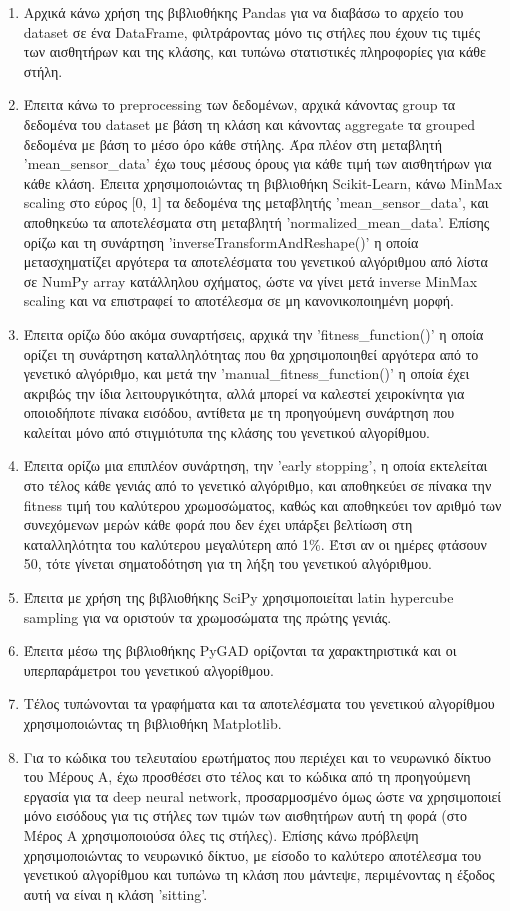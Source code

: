 \documentclass[12pt,a4paper]{article}
\begin{document}
\begin{enumerate}
    \item Αρχικά κάνω χρήση της βιβλιοθήκης Pandas για να διαβάσω το αρχείο του dataset σε ένα DataFrame, φιλτράροντας μόνο τις στήλες που έχουν τις τιμές των αισθητήρων και της κλάσης, και τυπώνω στατιστικές πληροφορίες για κάθε στήλη.
    \item Έπειτα κάνω το preprocessing των δεδομένων, αρχικά κάνοντας group τα δεδομένα του dataset με βάση τη κλάση και κάνοντας aggregate τα grouped δεδομένα με βάση το μέσο όρο κάθε στήλης. Άρα πλέον στη μεταβλητή 'mean\_sensor\_data' έχω τους μέσους όρους για κάθε τιμή των αισθητήρων για κάθε κλάση. Έπειτα χρησιμοποιώντας τη βιβλιοθήκη Scikit-Learn, κάνω MinMax scaling στο εύρος [0, 1] τα δεδομένα της μεταβλητής 'mean\_sensor\_data', και αποθηκεύω τα αποτελέσματα στη μεταβλητή 'normalized\_mean\_data'. Επίσης ορίζω και τη συνάρτηση 'inverseTransformAndReshape()' η οποία μετασχηματίζει αργότερα τα αποτελέσματα του γενετικού αλγόριθμου από λίστα σε ΝumPy array κατάλληλου σχήματος, ώστε να γίνει μετά inverse MinMax scaling και να επιστραφεί το αποτέλεσμα σε μη κανονικοποιημένη μορφή.
    \item Έπειτα ορίζω δύο ακόμα συναρτήσεις, αρχικά την 'fitness\_function()' η οποία ορίζει τη συνάρτηση καταλληλότητας που θα χρησιμοποιηθεί αργότερα από το γενετικό αλγόριθμο, και μετά την 'manual\_fitness\_function()' η οποία έχει ακριβώς την ίδια λειτουργικότητα, αλλά μπορεί να καλεστεί χειροκίνητα για οποιοδήποτε πίνακα εισόδου, αντίθετα με τη προηγούμενη συνάρτηση που καλείται μόνο από στιγμιότυπα της κλάσης του γενετικού αλγορίθμου.
    \item Έπειτα ορίζω μια επιπλέον συνάρτηση, την 'early stopping', η οποία εκτελείται στο τέλος κάθε γενιάς από το γενετικό αλγόριθμο, και αποθηκεύει σε πίνακα την fitness τιμή του καλύτερου χρωμοσώματος, καθώς και αποθηκεύει τον αριθμό των συνεχόμενων μερών κάθε φορά που δεν έχει υπάρξει βελτίωση στη καταλληλότητα του καλύτερου μεγαλύτερη από 1\%. Έτσι αν οι ημέρες φτάσουν 50, τότε γίνεται σηματοδότηση για τη λήξη του γενετικού αλγόριθμου.
    \item Έπειτα με χρήση της βιβλιοθήκης SciPy χρησιμοποιείται latin hypercube sampling για να οριστούν τα χρωμοσώματα της πρώτης γενιάς.
    \item Έπειτα μέσω της βιβλιοθήκης PyGAD ορίζονται τα χαρακτηριστικά και οι υπερπαράμετροι του γενετικού αλγορίθμου.
    \item Τέλος τυπώνονται τα γραφήματα και τα αποτελέσματα του γενετικού αλγορίθμου χρησιμοποιώντας τη βιβλιοθήκη Matplotlib.
    \item Για το κώδικα του τελευταίου ερωτήματος που περιέχει και το νευρωνικό δίκτυο του Μέρους Α, έχω προσθέσει στο τέλος και το κώδικα από τη προηγούμενη εργασία για τα deep neural network, προσαρμοσμένο όμως ώστε να χρησιμοποιεί μόνο εισόδους για τις στήλες των τιμών των αισθητήρων αυτή τη φορά (στο Μέρος Α χρησιμοποιούσα όλες τις στήλες). Επίσης κάνω πρόβλεψη χρησιμοποιώντας το νευρωνικό δίκτυο, με είσοδο το καλύτερο αποτέλεσμα του γενετικού αλγορίθμου και τυπώνω τη κλάση που μάντεψε, περιμένοντας η έξοδος αυτή να είναι η κλάση 'sitting'.
\end{enumerate}
\end{document}
